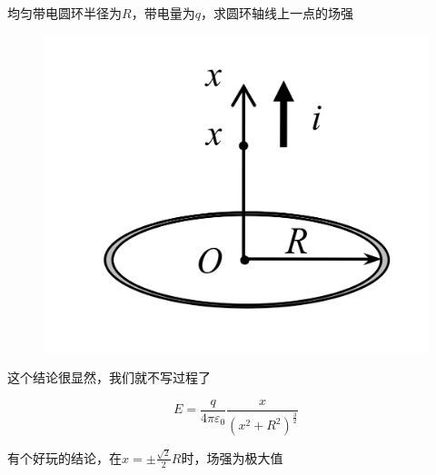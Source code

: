 \documentclass[lang=cn,10pt]{elegantbook}
\begin{document}
		\begin{example}
			均匀带电圆环半径为$R$，带电量为$q$，求圆环轴线上一点的场强
		\end{example}
		\begin{solution}
			\begin{figure}[H]
			\centering
			\includegraphics[width=0.3\linewidth]{image/IMG_0408(20231116-173746)}
			\caption{}
			\label{fig:img040820231116-173746}
			\end{figure}
			
			这个结论很显然，我们就不写过程了
			
			\begin{equation*}
				E=\frac{q}{4\pi \varepsilon _0}\frac{x}{\left( x^2+R^2 \right) ^{\frac{3}{2}}}
			\end{equation*}
		\end{solution}
		\begin{note}
			有个好玩的结论，在$x=\pm\frac{\sqrt{2}}{2}R$时，场强为极大值
		\end{note}
		
\end{document}
